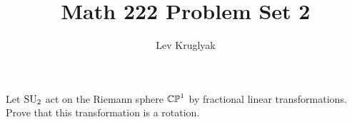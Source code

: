 \documentclass{lkx_pset}
\title{Math 222 Problem Set 2}
\author{Lev Kruglyak}
\begin{document}
\maketitle

\begin{problem}{6}
 Let $\operatorname{SU}_2$ act on the Riemann sphere $\mathbb{CP}^1$ by fractional linear transformations. Prove that this transformation is a rotation.
\end{problem}
\end{document}
